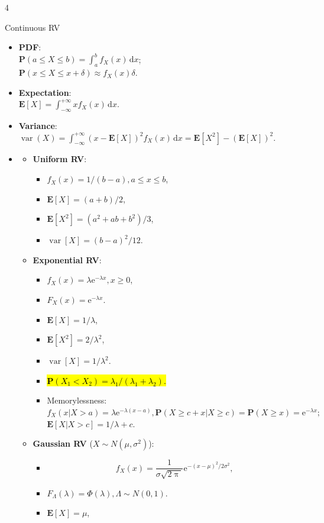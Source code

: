 \documentclass[landscape,a4paper]{article}
\renewcommand{\emph}[1]{\hl{#1}}
\newcommand{\e}{\mathrm{e}}
\newcommand{\PP}{\mathbf{P}}
\newcommand{\EE}{\mathbf{E}}
\newcommand{\var}{\operatorname{var}}
\begin{document}
\begin{multicols*}{4}
\begin{card}{Continuous RV}
\begin{itemize}
				\item \textbf{PDF}:\\ $\PP(a\le X\le b)=\int_a^bf_X(x)\,\mathrm dx$;\\
				$\PP(x\le X\le x+\delta)\approx f_X(x)\delta$.
				\item \textbf{Expectation}:\\ $\EE[X]=\int_{-\infty}^{+\infty} xf_X(x)\,\mathrm dx$.
				\item \textbf{Variance}:\\ $\var(X)=\int_{-\infty}^{+\infty}\left(x-\EE[X]\right)^2f_X(x)\,\mathrm dx=\EE[X^2]-\left(\EE[X]\right)^2$.
				\item \begin{itemize}
					\item \textbf{Uniform RV}:
					\begin{itemize}
						\item $f_X(x)=1/(b-a),a\le x\le b$,
						\item $\EE[X]=(a+b)/2$,
						\item $\EE[X^2]=(a^2+ab+b^2)/3$,
						\item $\var[X]=(b-a)^2/12$.
					\end{itemize}
					\item \textbf{Exponential RV}:
					\begin{itemize}
						\item $f_X(x)=\lambda\e^{-\lambda x},x\ge 0$,
						\item $F_X(x)=\e^{-\lambda x}$.
						\item $\EE[X]=1/\lambda$,
						\item $\EE[X^2]=2/\lambda^2$,
						\item $\var[X]=1/\lambda^2$.
						\item \emph{$\PP(X_1<X_2)=\lambda_1/(\lambda_1+\lambda_2)$.}
						\item Memorylessness:\\
						$f_X(x|X>a)=\lambda \e^{-\lambda(x-a)}, \PP(X\ge c+x|X\ge c)=\PP(X\ge x)=\e^{-\lambda x};$\\$\EE[X|X>c]=1/\lambda+c$.
					\end{itemize}
					\item \textbf{Gaussian RV} ($X\sim N(\mu,\sigma^2)$):
					\begin{itemize}
						\item \[f_X(x)=\frac{1}{\sigma\sqrt{2\uppi}}\e^{-(x-\mu)^2/2\sigma^2},\]
						\item $F_\Lambda(\lambda)=\varPhi(\lambda),\Lambda\sim N(0,1)$.
						\item $\EE[X]=\mu$,

\end{itemize}
\end{itemize}
\end{itemize}
\end{card}
\end{multicols*}
\end{document}
